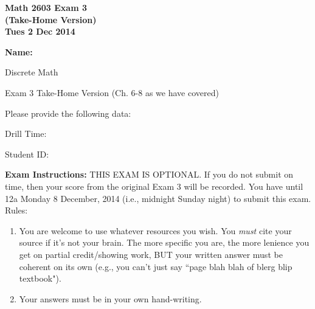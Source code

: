 \documentclass[12pt,letterpaper]{article}
\begin{document}
\flushleft
\begin{multicols}{2}

\begin{large}\textbf{Math 2603 Exam 3 \\(Take-Home Version) \\
\hspace{0.36pc}Tues 2 Dec 2014}\end{large}

\hfill\textbf{Name:  }\underline{\hspace{35ex}} %
\\
\vspace{.5in}

\end{multicols}

\pagestyle{empty}

\vspace{4pc}

\begin{center}\LARGE Discrete Math

Exam 3 Take-Home Version (Ch. 6-8 as we have covered) \end{center}

\vspace{2pc}
Please provide the following data:

\vspace{2pc}
Drill Time: \underline{\hspace{40ex}}

\vspace{2pc}
Student ID: \underline{\hspace{40ex}}

\vspace{3pc}
{\bf Exam Instructions:} THIS EXAM IS OPTIONAL.  If you do not submit on time, then your score from the original Exam 3 will be recorded.  You have until 12a Monday 8 December, 2014 (i.e., midnight Sunday night) to submit this exam.  Rules: 
\begin{enumerate}
\item You are welcome to use whatever resources you wish.  You \emph{must} cite your source if it's not your brain.  The more specific you are, the more lenience you get on partial credit/showing work, BUT your written answer must be coherent on its own (e.g., you can't just say ``page blah blah of blerg blip textbook").
\item Your answers must be in your own hand-writing.
\end{enumerate}  
\end{document}

